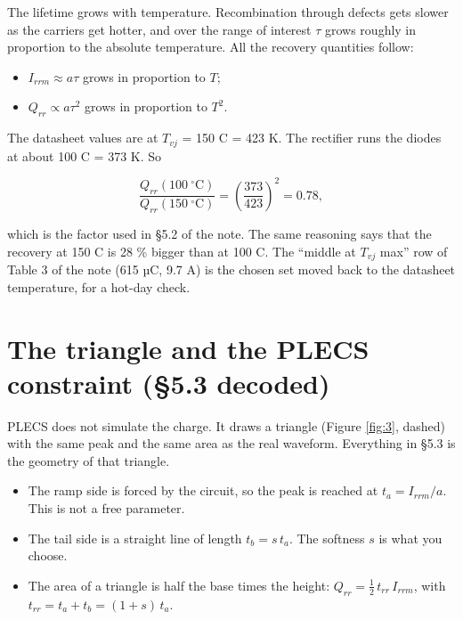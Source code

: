 \documentclass[11pt,a4paper,numbers=noenddot]{scrartcl}
\providecommand{\tightlist}{\setlength{\itemsep}{0pt}\setlength{\parskip}{0pt}}
\begin{document}
\begin{onehalfspace}
The lifetime grows with temperature. Recombination through defects gets slower as the carriers get hotter, and over the range of interest \(\tau\) grows roughly in proportion to the absolute temperature. All the recovery quantities follow:

\begin{itemize}
\tightlist
\item
  \(I_{rrm} \approx a\tau\) grows in proportion to \(T\);
\item
  \(Q_{rr} \propto a\tau^2\) grows in proportion to \(T^2\).
\end{itemize}

The datasheet values are at \(T_{vj}\) = 150 \textdegree{}C = 423 K. The rectifier runs the diodes at about 100 \textdegree{}C = 373 K. So

\[\frac{Q_{rr}(100\ ^\circ\text{C})}{Q_{rr}(150\ ^\circ\text{C})} = \left(\frac{373}{423}\right)^2 = 0.78,\]

which is the factor used in \S5.2 of the note. The same reasoning says that the recovery at 150 \textdegree{}C is 28 \% bigger than at 100 \textdegree{}C. The ``middle at \(T_{vj}\) max'' row of Table 3 of the note (615 µC, 9.7 A) is the chosen set moved back to the datasheet temperature, for a hot-day check.

\section{\texorpdfstring{The triangle and the PLECS constraint (\S5.3 decoded)}{The triangle and the PLECS constraint (5.3 decoded)}}\label{the-triangle-and-the-plecs-constraint-5.3-decoded}

PLECS does not simulate the charge. It draws a triangle (Figure \ref{fig:3}, dashed) with the same peak and the same area as the real waveform. Everything in \S5.3 is the geometry of that triangle.

\begin{itemize}
\tightlist
\item
  The ramp side is forced by the circuit, so the peak is reached at \(t_a = I_{rrm}/a\). This is not a free parameter.
\item
  The tail side is a straight line of length \(t_b = s\,t_a\). The softness \(s\) is what you choose.
\item
  The area of a triangle is half the base times the height: \(Q_{rr} = \tfrac{1}{2}\, t_{rr}\, I_{rrm}\), with \(t_{rr} = t_a + t_b = (1+s)\, t_a\).
\end{itemize}


\end{onehalfspace}
\end{document}
